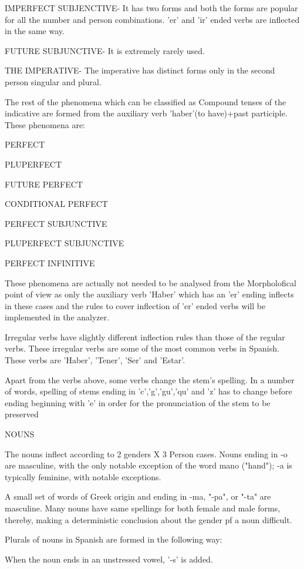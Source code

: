 \documentclass[11pt,letterpaper]{article}
\begin{document}
IMPERFECT SUBJENCTIVE- It has two forms and both the forms are popular for all the number and person combinations. 'er' and 'ir' ended verbs are inflected in the same way.

FUTURE SUBJUNCTIVE- It is extremely rarely used.

THE IMPERATIVE- The imperative has distinct forms only in the second person singular and plural.

The rest of the phenomena which can be classified as Compound tenses of the indicative are formed from the auxiliary verb 'haber'(to have)+past participle. These phenomena are:

	PERFECT

	PLUPERFECT

	FUTURE PERFECT

	CONDITIONAL PERFECT

	PERFECT SUBJUNCTIVE

	PLUPERFECT SUBJUNCTIVE

	PERFECT INFINITIVE

These phenomena are actually not needed to be analysed from the Morpholofical point of view as only the auxiliary verb 'Haber' which has an 'er' ending inflects in these cases and the rules to cover inflection of 'er' ended verbs will be implemented in the analyzer.

Irregular verbs have slightly different inflection rules than those of the regular verbs. These irregular verbs are some of the most common verbs in Spanish. These verbs are 'Haber', 'Tener', 'Ser' and 'Estar'.

Apart from the verbs above, some verbs change the stem's spelling. In a number of words, spelling of stems ending in 'c','g','gu','qu' and 'z' has to change before ending beginning with 'e' in order for the pronunciation of the stem to be preserved


NOUNS

The nouns inflect according to 2 genders X 3 Person cases. Nouns ending in -o are masculine, with the only notable exception of the word mano ("hand"); -a is typically feminine, with notable exceptions.
 
A small set of words of Greek origin and ending in -ma, "-pa", or "-ta" are masculine. Many nouns have same spellings for both female and male forms, thereby, making a deterministic conclusion about the gender pf a noun difficult.

Plurals of nouns in Spanish  are formed in the following way:

	When the noun ends in an unstressed vowel, '-s' is added.
\end{document}
